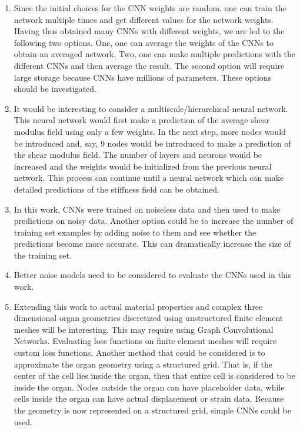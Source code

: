 \documentclass[12pt]{article}
\begin{document}
\begin{enumerate}
\item{Since the initial choices for the CNN weights are random, one can train the network multiple times and get different values for the network weights. Having thus obtained many CNNs with different weights, we are led to the following two options. One, one can average the weights of the CNNs to obtain an averaged network. Two, one can make multiple predictions with the different CNNs and then average the result. The second option will require large storage because CNNs have millions of parameters. These options should be investigated.}
\item{It would be interesting to consider a multiscale/hierarchical neural network. This neural network would first make a prediction of the average shear modulus field using only a few weights. In the next step, more nodes would be introduced and, say, 9 nodes would be introduced to make a prediction of the shear modulus field. The number of layers and neurons would be increased and the weights would be initialized from the previous neural network. This process can continue until a neural network which can make detailed predictions of the stiffness field can be obtained.}
\item{In this work, CNNs were trained on noiseless data and then used to make predictions on noisy data. Another option could be to increase the number of training set examples by adding noise to them and see whether the predictions become more accurate. This can dramatically increase the size of the training set.}
\item{Better noise models need to be considered to evaluate the CNNs used in this work.}
\item{Extending this work to actual material properties and complex three dimensional organ geometries discretized using unstructured finite element meshes will be interesting. This may require using Graph Convolutional Networks. Evaluating loss functions on finite element meshes will require custom loss functions. Another method that could be considered is to approximate the organ geometry using a structured grid. That is, if the center of the cell lies inside the organ, then that entire cell is considered to be inside the organ. Nodes outside the organ can have placeholder data, while cells inside the organ can have actual displacement or strain data. Because the geometry is now represented on a structured grid, simple CNNs could be used.}

\end{enumerate}
\end{document}
